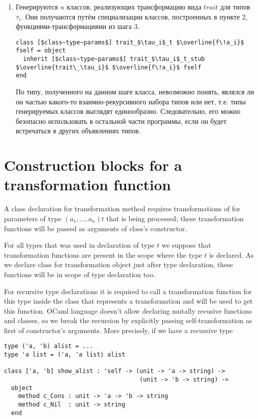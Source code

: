 \documentclass[acmsmall,review,anonymous]{acmart}\settopmatter{printfolios=true,printccs=false,printacmref=false}
\begin{document}
\begin{enumerate}
 \item Генерируются $n$ классов, реализующих трансформацию вида $trait$ для типов $\tau_i$. Они получаются путём специализации 
 классов, построенных в пункте 2, функциями-трансформациями из шага 3.
 \begin{lstlisting}
class [$class~type~params$] trait_$\tau_i$_t $\overline{f\!a_i}$ fself = object 
  inherit [$class~type~params$] trait_$\tau_i$_t_stub $\overline{trait\_\tau_i}$ $\overline{f\!a_i}$ fself
end
\end{lstlisting} 
По типу, полученного на данном шаге класса, невозможно понять, являлся ли он частью какого-то взаимно-рекурсивного набора типов или
нет, т.е. типы генерируемых классов выглядят единообразно. Следовательно, его можно безопасно использовать в остальной части программы, если он будет встречаться в других объявлениях типов.
\end{enumerate}


\section{Construction blocks for a transformation function}
A class declaration for transformation method requires transformations of for parameters of type $(a_1,...,a_n) t$ that is being processed; these transformation functions will be passed as arguments of class's constructor.

For all types that was used in declaration of type $t$ we suppose that transformation functions are present in the scope where the type $t$ is declared. As we declare class for transformation object just after type declaration, these functions will be in scope of type declaration too.

For recursive type declarations it is required to call a transformation function for this type inside the class that represents a transformation and will be used to get this function. OCaml language doesn't allow declaring mutally recusive functions and classes, so we break the recursion by explicitly passing self-transformation as first of constructor's arguments. More precisely, if we have a recursive type 

\begin{lstlisting}
type ('a, 'b) alist = ...
type 'a list = ('a, 'a list) alist

class ['a, 'b] show_alist : 'self -> (unit -> 'a -> string) ->
                                      (unit -> 'b -> string) ->
  object
    method c_Cons : unit -> 'a -> 'b -> string
    method c_Nil  : unit -> string
  end
\end{lstlisting}
\end{document}
